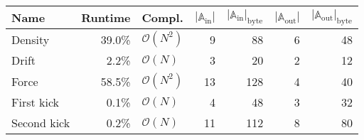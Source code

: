 \begin{tabular}{l|rlrrrr}
Name & Runtime & Compl. & \phantom{xx} $|\mathbb{A}_{\text{in}}|$ \phantom{xx} & \phantom{xx} $|\mathbb{A}_{\text{in}}|_{\text{byte}}$ \phantom{xx} & \phantom{xx} $|\mathbb{A}_{\text{out}}|$ \phantom{xx} & \phantom{xx} $|\mathbb{A}_{\text{out}}|_{\text{byte}}$ \\
  \hline
  Density &
  	39.0\% & 
  	$\mathcal{O}(N^2)$ &
  	9 & 88 &
  	6 & 48 \\
  Drift &
  	2.2\% & 
  	$\mathcal{O}(N)$ &
  	3 & 20 &
  	2 & 12 \\
  Force &
  	58.5\% & 
  	$\mathcal{O}(N^2)$ &
  	13 & 128 &
  	4 & 40 \\
  First kick &
  	0.1\% & 
  	$\mathcal{O}(N)$ &
  	4 & 48 &
  	3 & 32 \\
  Second kick &
  	0.2\% & 
  	$\mathcal{O}(N)$ &
  	11 & 112 &
  	8 & 80 \\
  \hline
\end{tabular}